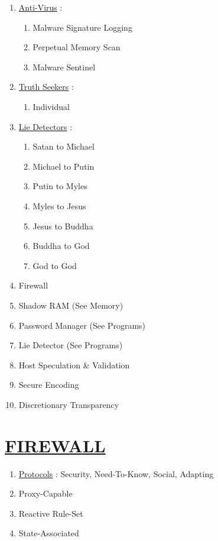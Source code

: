 \documentclass[11pt]{article}
\begin{document}
\begin{enumerate}
	\item[] \ul{Anti-Virus} :
	\begin{enumerate}
		\item[] Malware Signature Logging
		\item[] Perpetual Memory Scan
		\item[] Malware Sentinel
	\end{enumerate}

	\item[] \ul{Truth Seekers} :
	\begin{enumerate}
		\item[] Individual
	\end{enumerate}

	\item[] \ul{Lie Detectors} :
	\begin{enumerate}
		\item[] Satan to Michael
		\item[] Michael to Putin
		\item[] Putin to Myles
		\item[] Myles to Jesus
		\item[] Jesus to Buddha
		\item[] Buddha to God
		\item[] God to God
	\end{enumerate}

	\item[] Firewall
	\item[] Shadow RAM (See Memory)
	\item[] Password Manager (See Programs)
	\item[] Lie Detector (See Programs)
	\item[] Host Speculation \& Validation
	\item[] Secure Encoding
	\item[] Discretionary Transparency
	
\end{enumerate}


\section*{\ul{FIREWALL}}
\begin{enumerate}
	\item[] \ul{Protocols} : Security, Need-To-Know, Social, Adapting

	\item[] Proxy-Capable
	\item[] Reactive Rule-Set
	\item[] State-Associated

\end{enumerate}
\end{document}
